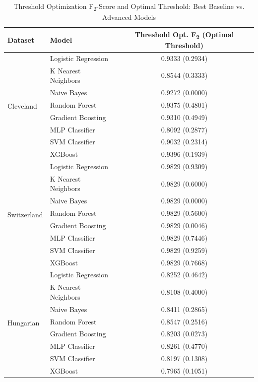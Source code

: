 \documentclass{article}
\begin{document}
\begin{table}[htbp]
\centering
\caption{Threshold Optimization F\textsubscript{2}-Score and Optimal Threshold: Best Baseline vs. Advanced Models}
\label{tab:advanced_comparison_thresh_opt}
\begin{tabular}{llc}
\toprule
Dataset     & Model                & Threshold Opt. F\textsubscript{2} (Optimal Threshold) \\
\midrule
\multirow{8}{*}{Cleveland} & Logistic Regression  & 0.9333 (0.2934)    \\
           & K Nearest Neighbors  & 0.8544 (0.3333)    \\
           & Naive Bayes          & 0.9272 (0.0000)    \\
           & Random Forest        & 0.9375 (0.4801)    \\
           & Gradient Boosting    & 0.9310 (0.4949)    \\
           & MLP Classifier       & 0.8092 (0.2877)    \\
           & SVM Classifier       & 0.9032 (0.2314)    \\
           & XGBoost              & 0.9396 (0.1939)    \\
\midrule
\multirow{8}{*}{Switzerland} & Logistic Regression  & 0.9829 (0.9309)    \\
           & K Nearest Neighbors  & 0.9829 (0.6000)    \\
           & Naive Bayes          & 0.9829 (0.0000)    \\
           & Random Forest        & 0.9829 (0.5600)    \\
           & Gradient Boosting    & 0.9829 (0.0046)    \\
           & MLP Classifier       & 0.9829 (0.7446)    \\
           & SVM Classifier       & 0.9829 (0.9259)    \\
           & XGBoost              & 0.9829 (0.7668)    \\
\midrule
\multirow{8}{*}{Hungarian} & Logistic Regression  & 0.8252 (0.4642)    \\
           & K Nearest Neighbors  & 0.8108 (0.4000)    \\
           & Naive Bayes          & 0.8411 (0.2865)    \\
           & Random Forest        & 0.8547 (0.2516)    \\
           & Gradient Boosting    & 0.8203 (0.0273)    \\
           & MLP Classifier       & 0.8261 (0.4770)    \\
           & SVM Classifier       & 0.8197 (0.1308)    \\
           & XGBoost              & 0.7965 (0.1051)    \\
\bottomrule
\end{tabular}
\end{table}
\end{document}

